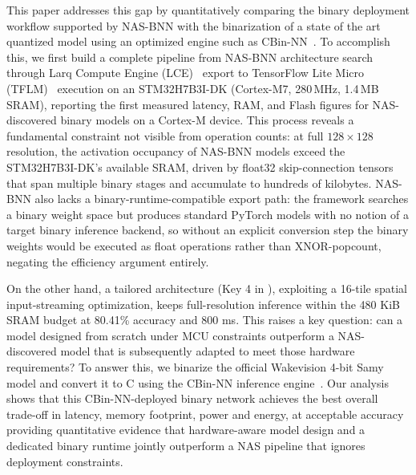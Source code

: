 \documentclass[conference]{IEEEtran}
\begin{document}
This paper addresses this gap by quantitatively comparing the binary deployment workflow supported by NAS-BNN with the binarization of a state of the art quantized model using an optimized engine such as CBin-NN~\cite{sakr2024cbinnn}.
To accomplish this, we first build a complete pipeline from NAS-BNN architecture search through Larq Compute Engine (LCE)~\cite{bannink2021larq} export to TensorFlow Lite Micro (TFLM)~\cite{david2021tflitemicro} execution on an STM32H7B3I-DK (Cortex-M7, 280\,MHz, 1.4\,MB SRAM), reporting the first measured latency, RAM, and Flash figures for NAS-discovered binary models on a Cortex-M device.
This process reveals a fundamental constraint not visible from operation counts: at full $128\times128$ resolution, the activation occupancy of NAS-BNN models exceed the STM32H7B3I-DK's available SRAM, driven by float32 skip-connection tensors that span multiple binary stages and accumulate to hundreds of kilobytes.
NAS-BNN also lacks a binary-runtime-compatible export path: the framework searches a binary weight space but produces standard PyTorch models with no notion of a target binary inference backend, so without an explicit conversion step the binary weights would be executed as float operations rather than XNOR-popcount, negating the efficiency argument entirely.

On the other hand, a tailored architecture (Key 4 in \cite{pighetti2024exploring}), exploiting a 16-tile spatial input-streaming optimization, keeps full-resolution inference within the 480 KiB SRAM budget at 80.41\% accuracy and 800 ms.
This raises a key question: can a model designed from scratch under MCU constraints outperform a NAS-discovered model that is subsequently adapted to meet those hardware requirements?
To answer this, we binarize the official Wakevision 4-bit Samy model and convert it to C using the CBin-NN inference engine~\cite{sakr2024cbinnn}.
Our analysis shows that this CBin-NN-deployed binary network achieves the best overall trade-off in latency, memory footprint, power and energy, at acceptable accuracy providing quantitative evidence that hardware-aware model design and a dedicated binary runtime jointly outperform a NAS pipeline that ignores deployment constraints.
\end{document}
